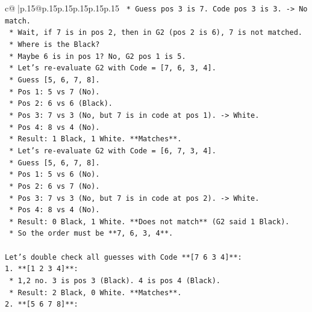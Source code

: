\documentclass{article}
\begin{document}
{\begin{supertabular}{c@{$\;$}|p{.15\linewidth}@{}p{.15\linewidth}p{.15\linewidth}p{.15\linewidth}p{.15\linewidth}p{.15\linewidth}}
{{{\texttt{                *   Guess pos 3 is 7. Code pos 3 is 3. {-}> No match.} \\
\texttt{                *   Wait, if 7 is in pos 2, then in G2 (pos 2 is 6), 7 is not matched.} \\
\texttt{                *   Where is the Black?} \\
\texttt{                *   Maybe 6 is in pos 1? No, G2 pos 1 is 5.} \\
\texttt{                *   Let's re{-}evaluate G2 with Code = {[}7, 6, 3, 4{]}.} \\
\texttt{                    *   Guess {[}5, 6, 7, 8{]}.} \\
\texttt{                    *   Pos 1: 5 vs 7 (No).} \\
\texttt{                    *   Pos 2: 6 vs 6 (Black).} \\
\texttt{                    *   Pos 3: 7 vs 3 (No, but 7 is in code at pos 1). {-}> White.} \\
\texttt{                    *   Pos 4: 8 vs 4 (No).} \\
\texttt{                    *   Result: 1 Black, 1 White. **Matches**.} \\
\texttt{                *   Let's re{-}evaluate G2 with Code = {[}6, 7, 3, 4{]}.} \\
\texttt{                    *   Guess {[}5, 6, 7, 8{]}.} \\
\texttt{                    *   Pos 1: 5 vs 6 (No).} \\
\texttt{                    *   Pos 2: 6 vs 7 (No).} \\
\texttt{                    *   Pos 3: 7 vs 3 (No, but 7 is in code at pos 2). {-}> White.} \\
\texttt{                    *   Pos 4: 8 vs 4 (No).} \\
\texttt{                    *   Result: 0 Black, 1 White. **Does not match** (G2 said 1 Black).} \\
\texttt{    *   So the order must be **7, 6, 3, 4**.} \\
\\ 
\texttt{Let's double check all guesses with Code **{[}7 6 3 4{]}**:} \\
\texttt{1.  **{[}1 2 3 4{]}**:} \\
\texttt{    *   1,2 no. 3 is pos 3 (Black). 4 is pos 4 (Black).} \\
\texttt{    *   Result: 2 Black, 0 White. **Matches**.} \\
\texttt{2.  **{[}5 6 7 8{]}**:} \\
}}}
\end{supertabular}}
\end{document}
